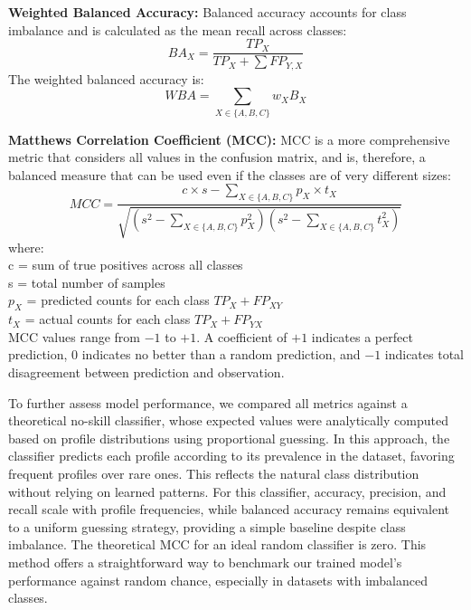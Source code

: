 \documentclass[oneside, a4paper, onecolumn, 11pt]{article}
\begin{document}
\textbf{Weighted Balanced Accuracy:}
Balanced accuracy accounts for class imbalance and is calculated as the mean recall across classes:
\begin{equation}
    BA_X = \frac{TP_X}{TP_X + \sum FP_{Y,X}}
\end{equation}
The weighted balanced accuracy is:
\begin{equation}
    WBA = \sum_{X \in \{A,B,C\}} w_X B_X
\end{equation}

\textbf{Matthews Correlation Coefficient (MCC):}
MCC is a more comprehensive metric that considers all values in the confusion matrix, and is, therefore, a balanced measure that can be used even if the classes are of very different sizes:
\begin{equation}
    MCC = \frac{c \times s - \sum_{X \in \{A,B,C\}} p_X \times t_X}
    {\sqrt{\left(s^2 - \sum_{X \in \{A,B,C\}} p_X^2\right) \left(s^2 - \sum_{X \in \{A,B,C\}} t_X^2\right)}}
\end{equation}
where: \\
 c = sum of true positives across all classes \\
 s = total number of samples \\
 \(p_X\) = predicted counts for each class \(TP_X+FP_{XY}\) \\
 \(t_X\) = actual counts for each class \(TP_X+FP_{YX}\) \\
 
 MCC values range from $-1$ to $+1$. A coefficient of $+1$ indicates a perfect prediction, 0 indicates no better than a random prediction, and $-1$ indicates total disagreement between prediction and observation.

To further assess model performance, we compared all metrics against a theoretical no-skill classifier, whose expected values were analytically computed based on profile distributions using proportional guessing. In this approach, the classifier predicts each profile according to its prevalence in the dataset, favoring frequent profiles over rare ones. This reflects the natural class distribution without relying on learned patterns. For this classifier, accuracy, precision, and recall scale with profile frequencies, while balanced accuracy remains equivalent to a uniform guessing strategy, providing a simple baseline despite class imbalance. The theoretical MCC for an ideal random classifier is zero. This method offers a straightforward way to benchmark our trained model’s performance against random chance, especially in datasets with imbalanced classes.
\end{document}

